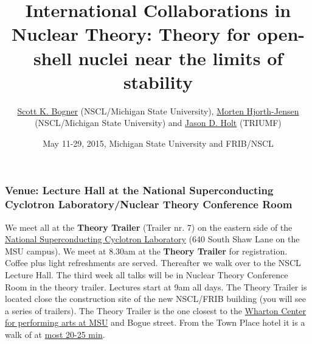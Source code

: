\documentclass{beamer}
\begin{document}







\title{International Collaborations in Nuclear Theory: Theory for open-shell nuclei near the limits of stability}


\author{\href{{http://nscl.msu.edu/directory/bogner.html}}{Scott K. Bogner} (NSCL/Michigan State University), \href{{https://www.pa.msu.edu/profile/hjensen}}{Morten Hjorth-Jensen} (NSCL/Michigan State University) and \href{{http://www.triumf.ca/jason-d-holt}}{Jason D. Holt} (TRIUMF)\inst{}}
\institute{}


\date{May 11-29, 2015, Michigan State University and FRIB/NSCL
}

\begin{frame}
\titlepage
\end{frame}

\begin{frame}
\frametitle{Venue: Lecture Hall at the National Superconducting Cyclotron Laboratory/Nuclear Theory Conference Room}

\begin{block}{}
We meet all at the \textbf{Theory Trailer} (Trailer nr. 7) on the eastern side of the \href{{http://www.nscl.msu.edu/}}{National Superconducting Cyclotron
Laboratory} (640 South Shaw Lane on the MSU campus).  
We meet at 8.30am at the \textbf{Theory Trailer} for registration. Coffee plus light refreshments are served. Thereafter we walk over to the NSCL Lecture Hall. The third week all talks will be in Nuclear Theory Conference Room in the theory trailer. Lectures start at 9am all days.
The Theory Trailer is located close the construction site of the new NSCL/FRIB building (you will see a series of trailers). The Theory Trailer is the one closest to the \href{{http://www.whartoncenter.com}}{Wharton Center for performing arts at MSU} and Bogue street. 
From the Town Place hotel it is a walk of at \href{{https://www.google.com/maps/dir/2855+Hannah+Blvd,+East+Lansing,+MI+48823/640+South+Shaw+Lane,+East+Lansing,+MI/@42.7219308,-84.4747951,15z/data=!3m1!4b1!4m14!4m13!1m5!1m1!1s0x8822c2bce3547475:0xd5a97d9b6a59e537!2m2!1d-84.456337!2d42.718323!1m5!1m1!1s0x8822c2841754be71:0xb0ff5dca5dac1c71!2m2!1d-84.4738287!2d42.7247813!3e2}}{most 20-25 min}.


\end{block}
\end{frame}
\end{document}
